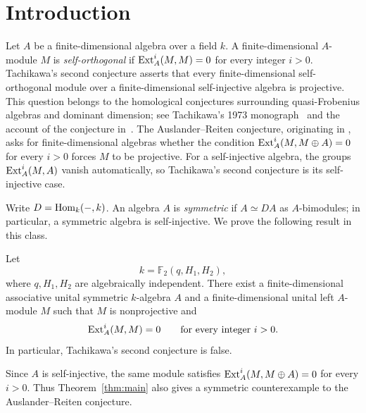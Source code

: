 \section{Introduction}\label{sec:introduction}

Let $A$ be a finite-dimensional algebra over a field $k$.
A finite-dimensional $A$-module $M$ is \emph{self-orthogonal} if
$\operatorname{Ext}_A^i(M,M)=0$ for every integer $i>0$.
Tachikawa's second conjecture asserts that every finite-dimensional
self-orthogonal module over a finite-dimensional self-injective
algebra is projective.  This question belongs to the homological
conjectures surrounding quasi-Frobenius algebras and dominant
dimension; see Tachikawa's 1973 monograph~\cite[pp.~VI--VII]{Tachikawa1973} and the account
of the conjecture in~\cite[p.~7288]{ChenXi2025TAMS}.
The Auslander--Reiten conjecture, originating in
\cite{AuslanderReiten1975}, asks for finite-dimensional algebras
whether the condition $\operatorname{Ext}_A^i(M,M\oplus A)=0$ for every $i>0$
forces $M$ to be projective. For a self-injective algebra, the groups
$\operatorname{Ext}_A^i(M,A)$ vanish automatically, so Tachikawa's second conjecture
is its self-injective case.

Write $D=\operatorname{Hom}_k(-,k)$. An algebra $A$ is \emph{symmetric} if
$A\simeq DA$ as $A$-bimodules; in particular, a symmetric algebra
is self-injective. We prove the following result in this class.

\begin{theorem}\label{thm:main}
Let
\[
 k=\mathbb F_2(q,H_1,H_2),
\]
where $q,H_1,H_2$ are algebraically independent.
There exist a finite-dimensional associative unital symmetric
$k$-algebra $A$ and a finite-dimensional unital left $A$-module $M$
such that $M$ is nonprojective and
\[
 \operatorname{Ext}_A^i(M,M)=0\qquad\text{for every integer }i>0.
\]
In particular, Tachikawa's second conjecture is false.
\end{theorem}

Since $A$ is self-injective, the same module satisfies
$\operatorname{Ext}_A^i(M,M\oplus A)=0$ for every $i>0$.
Thus Theorem~\ref{thm:main} also gives a symmetric counterexample to
the Auslander--Reiten conjecture.

